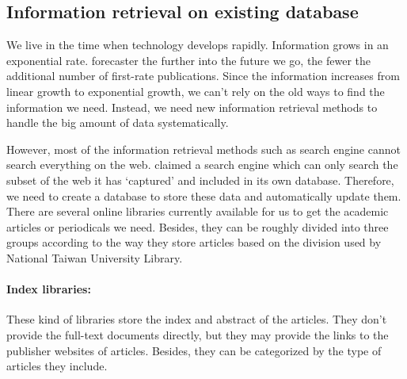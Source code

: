 	
\subsection{Information retrieval on existing database}
	We live in the time when technology develops rapidly. Information grows in an exponential rate. \cite{Tague1981} forecaster the further into the future we go, the fewer the additional number of first-rate publications. 
	Since the information increases from linear growth to exponential growth, we can't rely on the old ways to find the information we need. 
	Instead, we need new information retrieval methods to handle the big amount of data systematically. 
	
	However, most of the information retrieval methods such as search engine cannot search everything on the web. 
	\cite{Grehan2002} claimed a search engine which can only search the subset of the web it has ‘captured’ and included in its own database. 
	Therefore, we need to create a database to store these data and automatically update them.
	There are several online libraries currently available for us to get the academic articles or periodicals we need.
	Besides, they can be roughly divided into three groups according to the way they store articles based on the division used by National Taiwan University Library.\\

\paragraph{Index libraries:}
	These kind of libraries store the index and abstract of the articles.
	They don't provide the full-text documents directly, but they may provide the links to the publisher websites of articles.
	Besides, they can be categorized by the type of articles they include.
	
